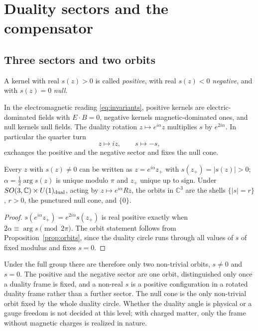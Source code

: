 \section{Duality sectors and the compensator}\label{sec:frames}

\subsection{Three sectors and two orbits}

\begin{definition}[Sectors]\label{def:sectors}
A kernel with real \(s(z)>0\) is called \emph{positive}, with real \(s(z)<0\) \emph{negative}, and with \(s(z)=0\) \emph{null}.
\end{definition}

In the electromagnetic reading \eqref{eq:invariants}, positive kernels are electric-dominated fields with \(E\cdot B=0\), negative kernels
magnetic-dominated ones, and null kernels null fields.  The duality rotation \(z\mapsto e^{i\alpha}z\) multiplies \(s\) by \(e^{2i\alpha}\).  In
particular the quarter turn
\begin{equation}\label{eq:quarterturn}
z\mapsto iz,\qquad s\mapsto-s,
\end{equation}
exchanges the positive and the negative sector and fixes the null cone.

\begin{proposition}\label{prop:duality}
Every \(z\) with \(s(z)\neq0\) can be written as \(z=e^{i\alpha}z_+\) with \(s(z_+)=|s(z)|>0\); \(\alpha=\tfrac12\arg s(z)\) is unique modulo \(\pi\) and
\(z_+\) unique up to sign.  Under \(SO(3,\mathbb C)\times U(1)_{\rm dual}\), acting by \(z\mapsto e^{i\alpha}Rz\), the orbits in \(\mathbb C^3\) are
the shells \(\{|s|=r\}\), \(r>0\), the punctured null cone, and \(\{0\}\).
\end{proposition}

\begin{proof}
\(s(e^{i\alpha}z_+)=e^{2i\alpha}s(z_+)\) is real positive exactly when \(2\alpha\equiv\arg s\pmod{2\pi}\).  The orbit statement follows from
Proposition~\ref{prop:orbits}, since the duality circle runs through all values of \(s\) of fixed modulus and fixes \(s=0\).
\end{proof}

Under the full group there are therefore only two non-trivial orbits, \(s\neq0\) and \(s=0\).  The positive and the negative sector are one
orbit, distinguished only once a duality frame is fixed, and a non-real \(s\) is a positive configuration in a rotated duality frame rather
than a further sector.  The null cone is the only non-trivial orbit fixed by the whole duality circle.  Whether the duality angle is
physical or a gauge freedom is not decided at this level; with charged matter, only the frame without magnetic charges is realized in
nature.


